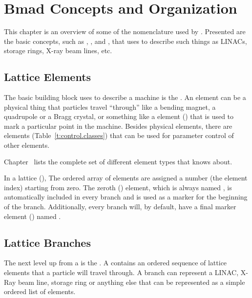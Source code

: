 \chapter{Bmad Concepts and Organization}
\label{c:lat.concepts}

This chapter is an overview of some of the nomenclature used
by \bmad. Presented are the basic concepts, such as ,
, and , that \bmad uses to describe such things
as LINACs, storage rings, X-ray beam lines, etc.  

\section{Lattice Elements}
\label{s:element.def}

The basic building block \bmad uses to describe a machine is the
 . An element can be a physical thing that
particles travel ``through'' like a bending magnet, a quadrupole or a
Bragg crystal, or something like a  element ()
that is used to mark a particular point in the machine.  Besides
physical elements, there are  elements
(Table~\ref{t:control.classes}) that can be used for parameter control
of other elements.

Chapter~ lists the complete set of different element
types that \bmad knows about.

In a lattice  (), The ordered array of
elements are assigned a number (the element index) starting from
zero. The zeroth  () element,
which is always named , is automatically included in
every branch and is used as a marker for the beginning of the branch.
Additionally, every branch will, by default, have a final marker
element () named .

\section{Lattice Branches}
\label{s:branch.def}

The next level up from a   is the 
. A   contains an
ordered sequence of lattice elements that a particle will travel
through. A branch can represent a LINAC, X-Ray beam line, storage ring
or anything else that can be represented as a simple ordered list of
elements.

